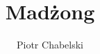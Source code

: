 \documentclass[hidelinks,12pt]{wzmgr}
\author{Piotr Chabelski}
\title{Madżong}
\begin{document}
\onehalfspacing
\maketitle




\printindex


\end{document}
